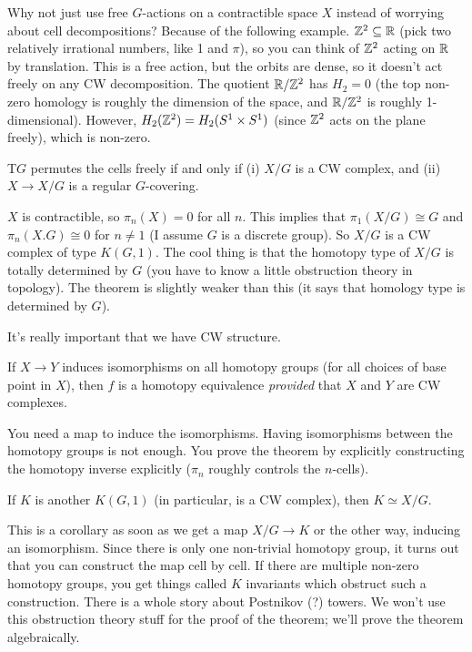 Why not just use free $G$-actions on a contractible space $X$ instead of worrying about cell decompositions? Because of the following example. $\mathbb{Z}^2\subseteq \mathbb{R}$ (pick two relatively irrational numbers, like 1 and $\pi$), so you can think of $\mathbb{Z}^2$ acting on $\mathbb{R}$ by translation. This is a free action, but the orbits are dense, so it doesn't act freely on any CW decomposition. The quotient $\mathbb{R}/\mathbb{Z}^2$ has $H_2=0$ (the top non-zero homology is roughly the dimension of the space, and $\mathbb{R}/\mathbb{Z}^2$ is roughly 1-dimensional). However, $H_2(\mathbb{Z}^2)=H_2(S^1\times S^1)$ (since $\mathbb{Z}^2$ acts on the plane freely), which is non-zero.
\begin{remark}
 T$G$ permutes the cells freely if and only if (i) $X/G$ is a CW complex, and (ii) $X\to X/G$ is a regular $G$-covering.
\end{remark}
\begin{remark}
 $X$ is contractible, so $\pi_n(X)=0$ for all $n$. This implies that $\pi_1(X/G)\cong G$ and $\pi_n(X.G)\cong 0$ for $n\neq 1$ (I assume $G$ is a discrete group). So $X/G$ is a CW complex of type $K(G,1)$. The cool thing is that the homotopy type of $X/G$ is totally determined by $G$ (you have to know a little obstruction theory in topology). The theorem is slightly weaker than this (it says that homology type is determined by $G$).
\end{remark}
It's really important that we have CW structure.
\begin{theorem}[Whitehead]
 If $X\to Y$ induces isomorphisms on all homotopy groups (for all choices of base point in $X$), then $f$ is a homotopy equivalence \emph{provided} that $X$ and $Y$ are CW complexes.
\end{theorem}
You need a map to induce the isomorphisms. Having isomorphisms between the homotopy groups is not enough. You prove the theorem by explicitly constructing the homotopy inverse explicitly ($\pi_n$ roughly controls the $n$-cells).
\begin{corollary}
 If $K$ is another $K(G,1)$ (in particular, is a CW complex), then $K\simeq X/G$.
\end{corollary}
This is a corollary as soon as we get a map $X/G\to K$ or the other way, inducing an isomorphism. Since there is only one non-trivial homotopy group, it turns out that you can construct the map cell by cell. If there are multiple non-zero homotopy groups, you get things called $K$ invariants which obstruct such a construction. There is a whole story about Postnikov (?) towers. We won't use this obstruction theory stuff for the proof of the theorem; we'll prove the theorem algebraically.

